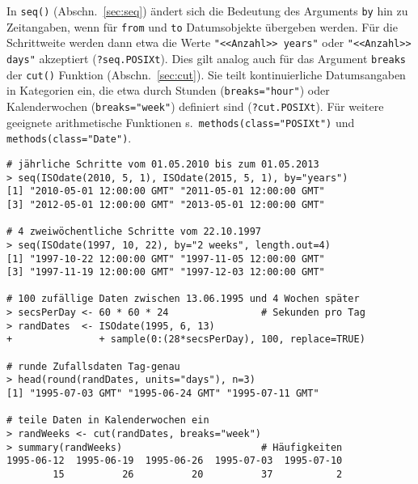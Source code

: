 In \lstinline!seq()! (Abschn.\ \ref{sec:seq}) ändert sich die Bedeutung des Arguments \lstinline!by! hin zu Zeitangaben, wenn für \lstinline!from! und \lstinline!to! Datumsobjekte übergeben werden. Für die Schrittweite werden dann etwa die Werte \lstinline!"<<Anzahl>> years"! oder \lstinline!"<<Anzahl>> days"! akzeptiert (\lstinline!?seq.POSIXt!). Dies gilt analog auch für das Argument \lstinline!breaks! der \lstinline!cut()! Funktion (Abschn.\ \ref{sec:cut}). Sie teilt kontinuierliche Datumsangaben in Kategorien ein, die etwa durch Stunden (\lstinline!breaks="hour"!) oder Kalenderwochen (\lstinline!breaks="week"!) definiert sind (\lstinline!?cut.POSIXt!). Für weitere geeignete arithmetische Funktionen s.\ \lstinline!methods(class="POSIXt")! und \lstinline!methods(class="Date")!.
\begin{lstlisting}
# jährliche Schritte vom 01.05.2010 bis zum 01.05.2013
> seq(ISOdate(2010, 5, 1), ISOdate(2015, 5, 1), by="years")
[1] "2010-05-01 12:00:00 GMT" "2011-05-01 12:00:00 GMT"
[3] "2012-05-01 12:00:00 GMT" "2013-05-01 12:00:00 GMT"

# 4 zweiwöchentliche Schritte vom 22.10.1997
> seq(ISOdate(1997, 10, 22), by="2 weeks", length.out=4)
[1] "1997-10-22 12:00:00 GMT" "1997-11-05 12:00:00 GMT"
[3] "1997-11-19 12:00:00 GMT" "1997-12-03 12:00:00 GMT"

# 100 zufällige Daten zwischen 13.06.1995 und 4 Wochen später
> secsPerDay <- 60 * 60 * 24                # Sekunden pro Tag
> randDates  <- ISOdate(1995, 6, 13)
+               + sample(0:(28*secsPerDay), 100, replace=TRUE)

# runde Zufallsdaten Tag-genau
> head(round(randDates, units="days"), n=3)
[1] "1995-07-03 GMT" "1995-06-24 GMT" "1995-07-11 GMT"

# teile Daten in Kalenderwochen ein
> randWeeks <- cut(randDates, breaks="week")
> summary(randWeeks)                        # Häufigkeiten
1995-06-12  1995-06-19  1995-06-26  1995-07-03  1995-07-10
        15          26          20          37           2
\end{lstlisting}
